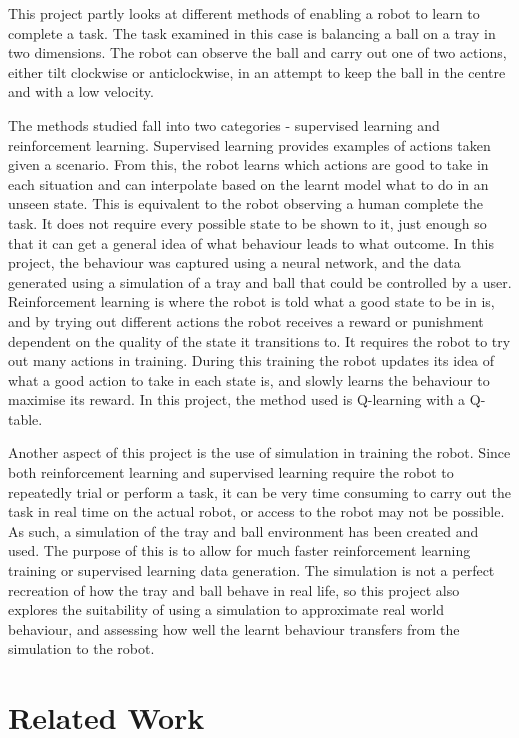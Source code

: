 \documentclass[12pt,a4paper]{article}
\begin{document}
This project partly looks at different methods of enabling a robot to learn to complete a task. The task examined in this case is balancing a ball on a tray in two dimensions. The robot can observe the ball and carry out one of two actions, either tilt clockwise or anticlockwise, in an attempt to keep the ball in the centre and with a low velocity. 

The methods studied fall into two categories - supervised learning and reinforcement learning. Supervised learning provides examples of actions taken given a scenario. From this, the robot learns which actions are good to take in each situation and can interpolate based on the learnt model what to do in an unseen state. This is equivalent to the robot observing a human complete the task. It does not require every possible state to be shown to it, just enough so that it can get a general idea of what behaviour leads to what outcome. In this project, the behaviour was captured using a neural network, and the data generated using a simulation of a tray and ball that could be controlled by a user. Reinforcement learning is where the robot is told what a good state to be in is, and by trying out different actions the robot receives a reward or punishment dependent on the quality of the state it transitions to. It requires the robot to try out many actions in training. During this training the robot updates its idea of what a good action to take in each state is, and slowly learns the behaviour to maximise its reward. In this project, the method used is Q-learning with a Q-table. 

Another aspect of this project is the use of simulation in training the robot. Since both reinforcement learning and supervised learning require the robot to repeatedly trial or perform a task, it can be very time consuming to carry out the task in real time on the actual robot, or access to the robot may not be possible. As such, a simulation of the tray and ball environment has been created and used. The purpose of this is to allow for much faster reinforcement learning training or supervised learning data generation. The simulation is not a perfect recreation of how the tray and ball behave in real life, so this project also explores the suitability of using a simulation to approximate real world behaviour, and assessing how well the learnt behaviour transfers from the simulation to the robot. 

\section{Related Work}
\end{document}
